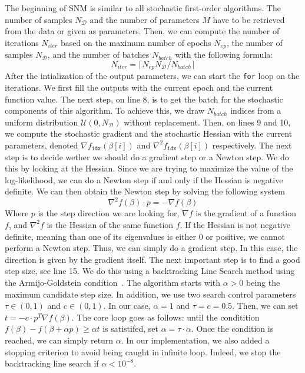 \documentclass[conference]{IEEEtran}
\begin{document}
The beginning of SNM is similar to all stochastic first-order algorithms. The number of samples $N_{\mathcal{D}}$ and the number of parameters $M$ have to be retrieved from the data or given as parameters. Then, we can compute the number of iterations $N_{iter}$ based on the maximum number of epochs $N_{ep}$, the number of samples $N_{\mathcal{D}}$, and the number of batches $N_{batch}$ with the following formula:
\[
N_{iter} = \lceil N_{ep}N_{\mathcal{D}}/N_{batch} \rceil
\]
After the intialization of the output parameters, we can start the \texttt{for} loop on the iterations. We first fill the outputs with the current epoch and the current function value. The next step, on line 8, is to get the batch for the stochastic components of this algorithm. To achieve this, we draw $N_{batch}$ indices from a uniform distribution $\mathcal{U}(0, N_{\mathcal{D}})$ without replacement. Then, on lines 9 and 10, we compute the stochastic gradient and the stochastic Hessian with the current parameters, denoted $\nabla f_{\texttt{idx}}(\beta[i])$ and $\nabla^2 f_{\texttt{idx}}(\beta[i])$ respectively. The next step is to decide wether we should do a gradient step or a Newton step. We do this by looking at the Hessian. Since we are trying to maximize the value of the log-likelihood, we can do a Newton step if and only if the Hessian is negative definite. We can then obtain the Newton step by solving the following system
\[
\nabla^2 f(\beta) \cdot p = - \nabla f(\beta)
\]
Where $p$ is the step direction we are looking for, $\nabla f$ is the gradient of a function $f$, and $\nabla^2 f$ is the Hessian of the same function $f$. If the Hessian is not negative definite, meaning than one of its eigenvalues is either 0 or positive, we cannot perform a Newton step. Thus, we can simply do a gradient step. In this case, the direction is given by the gradient itself. The next important step is to find a good step size, see line 15. We do this using a backtracking Line Search method using the Armijo-Goldstein condition~\cite{armijo_minimization_1966}. The algorithm starts with $\alpha>0$ being the maximum candidate step size. In addition, we use two search control parameters $\tau\in(0,1)$ and $c\in(0,1)$. In our case, $\alpha=1$ and $\tau=c=0.5$. Then, we can set $t = -c\cdot p^T\nabla f(\beta)$. The core loop goes as follows: until the conditition $f(\beta) - f(\beta + \alpha p) \geq \alpha t$ is satistifed, set $\alpha = \tau \cdot \alpha$. Once the condition is reached, we can simply return $\alpha$. In our implementation, we also added a stopping criterion to avoid being caught in infinite loop. Indeed, we stop the backtracking line search if $\alpha < 10^{-8}$. 
\end{document}
